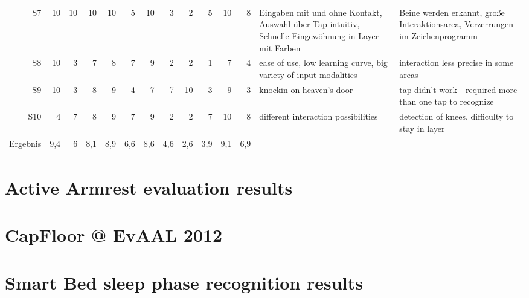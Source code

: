 \begin{landscape}
\begin{table}[htbp]
\begin{tabular}{rrrrrrrrrrrrm{4.5cm}m{4.5cm}}
    S7    & 10    & 10    & 10    & 10    & 5     & 10    & 3     & 2     & 5     & 10    & 8     & Eingaben mit und ohne Kontakt, Auswahl über Tap intuitiv, Schnelle Eingewöhnung in Layer mit Farben & Beine werden erkannt, große Interaktionsarea, Verzerrungen im Zeichenprogramm \\
    S8    & 10    & 3     & 7     & 8     & 7     & 9     & 2     & 2     & 1     & 7     & 4     & ease of use, low learning curve, big variety of input modalities & interaction less precise in some areas \\
    S9    & 10    & 3     & 8     & 9     & 4     & 7     & 7     & 10    & 3     & 9     & 3     & knockin on heaven's door & tap didn't work - required more than one tap to recognize \\
    S10   & 4     & 7     & 8     & 9     & 7     & 9     & 2     & 2     & 7     & 10    & 8     & different interaction possibilities & detection of knees, difficulty to stay in layer \\
    Ergebnis & 9,4   & 6     & 8,1   & 8,9   & 6,6   & 8,6   & 4,6   & 2,6   & 3,9   & 9,1   & 6,9   &       &  \\
    \bottomrule
    \end{tabular}%
  \label{tab:app_eval_captap_raw_quest}%
\end{table}%
\end{landscape}

\section{Active Armrest evaluation results}

\section{CapFloor @ EvAAL 2012}

\section{Smart Bed sleep phase recognition results}




